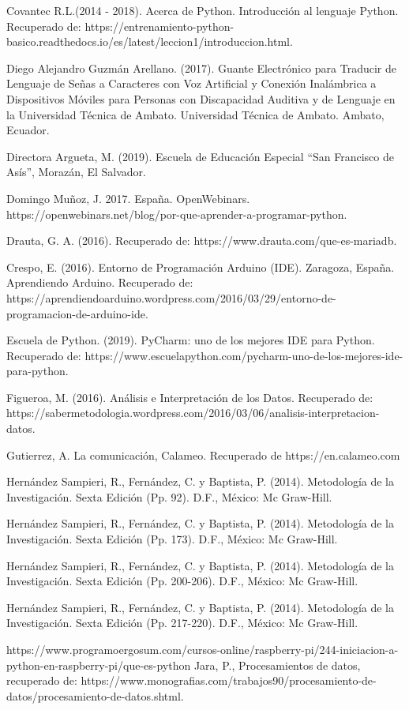 \documentclass[12pt]{report}%
\begin{document}
Covantec R.L.(2014 - 2018). Acerca de Python. Introducción al lenguaje Python. Recuperado  de: https://entrenamiento-python-basico.readthedocs.io/es/latest/leccion1/introduccion.html.

Diego Alejandro Guzmán Arellano. (2017). Guante Electrónico para Traducir de Lenguaje de  Señas a Caracteres con Voz Artificial y Conexión Inalámbrica a Dispositivos Móviles para Personas con Discapacidad Auditiva y de Lenguaje en la Universidad Técnica de Ambato. Universidad Técnica de Ambato. Ambato, Ecuador.

Directora Argueta, M. (2019). Escuela de Educación Especial “San Francisco de Asís”, Morazán, El Salvador.

Domingo Muñoz, J. 2017. España. OpenWebinars. https://openwebinars.net/blog/por-que-aprender-a-programar-python.

Drauta,  G. A. (2016). Recuperado de: https://www.drauta.com/que-es-mariadb.

Crespo, E. (2016). Entorno de Programación Arduino (IDE). Zaragoza, España. Aprendiendo  Arduino. Recuperado de: https://aprendiendoarduino.wordpress.com/2016/03/29/entorno-de-programacion-de-arduino-ide.

Escuela de Python. (2019). PyCharm: uno de los mejores IDE para Python. Recuperado de: https://www.escuelapython.com/pycharm-uno-de-los-mejores-ide-para-python.

Figueroa, M. (2016). Análisis e Interpretación de los Datos. Recuperado de: https://sabermetodologia.wordpress.com/2016/03/06/analisis-interpretacion-datos.

Gutierrez, A. La comunicación, Calameo. Recuperado de https://en.calameo.com

Hernández Sampieri, R., Fernández, C. y Baptista, P. (2014). Metodología de la Investigación. Sexta Edición (Pp. 92). D.F., México: Mc Graw-Hill.

Hernández Sampieri, R., Fernández, C. y Baptista, P. (2014). Metodología de la Investigación. Sexta Edición (Pp. 173). D.F., México: Mc Graw-Hill.

Hernández Sampieri, R., Fernández, C. y Baptista, P. (2014). Metodología de la Investigación. Sexta Edición (Pp. 200-206). D.F., México: Mc Graw-Hill.

Hernández Sampieri, R., Fernández, C. y Baptista, P. (2014). Metodología de la Investigación. Sexta Edición (Pp. 217-220). D.F., México: Mc Graw-Hill.

https://www.programoergosum.com/cursos-online/raspberry-pi/244-iniciacion-a-python-en-raspberry-pi/que-es-python
Jara, P., Procesamientos de datos, recuperado de: https://www.monografias.com/trabajos90/procesamiento-de-datos/procesamiento-de-datos.shtml.
\end{document}
